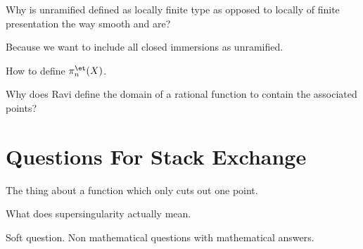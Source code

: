 \documentclass[12pt]{article}
\begin{document}
\begin{exercise}
Why is unramified defined as locally finite type as opposed to locally of finite presentation the way smooth and \etale are?
\end{exercise}

Because we want to include all closed immersions as unramified. 

\begin{exercise}
How to define $\pi_n^{\et}(X)$.
\end{exercise}

\begin{exercise}
Why does Ravi define the domain of a rational function to contain the associated points?
\end{exercise}

\section{Questions For Stack Exchange}

\begin{exercise}
The thing about a function which only cuts out one point.
\end{exercise}

\begin{exercise}
What does supersingularity actually mean.
\end{exercise}

\begin{exercise}
Soft question. Non mathematical questions with mathematical answers. 
\end{exercise}
\end{document}
